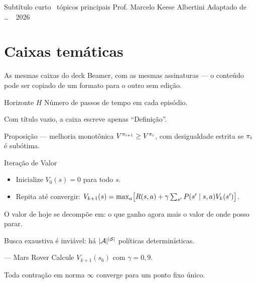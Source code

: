 \documentclass[11pt, a4paper]{article}
\begin{document}
     {Subtítulo curto \textbullet\ tópicos principais}
     {Prof. Marcelo Keese Albertini}
     {Adaptado de \ldots\ \textbullet\ 2026}

\section{Caixas temáticas}

As mesmas caixas do deck Beamer, com as mesmas assinaturas — o conteúdo
pode ser copiado de um formato para o outro sem edição.

\begin{defbox}{Horizonte $H$}
  Número de passos de tempo em cada episódio.
\end{defbox}

\begin{defbox}{}
  Com título vazio, a caixa escreve apenas ``Definição''.
\end{defbox}

\begin{teobox}{Proposição — melhoria monotônica}
  $V^{\pi_{i+1}} \ge V^{\pi_i}$, com desigualdade estrita se $\pi_i$ é subótima.
\end{teobox}

\begin{algbox}{Iteração de Valor}
  \begin{itemize}
    \item Inicialize $V_0(s) = 0$ para todo $s$.
    \item Repita até convergir:
      $V_{k+1}(s) = \max_a\bigl[R(s,a) + \gamma\sum_{s'}P(s'\mid s,a)V_k(s')\bigr]$.
  \end{itemize}
\end{algbox}

\begin{ideiabox}
  O valor de hoje se decompõe em: o que ganho agora mais o valor de onde posso parar.
\end{ideiabox}

\begin{alertabox}
  Busca exaustiva é inviável: há $\lvert\mathcal{A}\rvert^{\lvert\mathcal{S}\rvert}$ políticas determinísticas.
\end{alertabox}

\begin{exbox}{— Mars Rover}
  Calcule $V_{k+1}(s_6)$ com $\gamma = 0{,}9$.
\end{exbox}

\begin{provabox}
  Toda contração em norma $\infty$ converge para um ponto fixo único.
\end{provabox}
\end{document}
